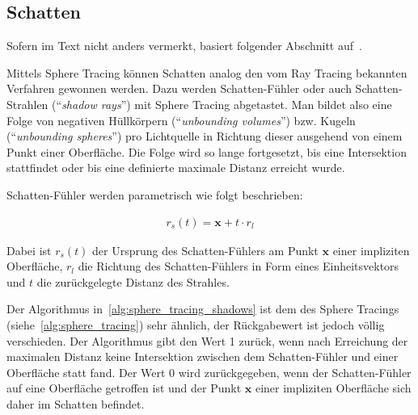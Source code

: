 
\subsection{Schatten}
\label{sec:rendering_implicit_surfaces_shadows}

Sofern im Text nicht anders vermerkt, basiert folgender Abschnitt
auf~\cite[S. 7]{reiner_smi_2011}.

Mittels Sphere Tracing können Schatten analog den vom Ray Tracing
bekannten Verfahren gewonnen werden. Dazu werden Schatten-Fühler oder
auch Schatten-Strahlen (``\textit{shadow rays}'') mit Sphere Tracing
abgetastet.  Man bildet also eine Folge von negativen Hüllkörpern
(``\textit{unbounding volumes}'') bzw. Kugeln (``\textit{unbounding
    spheres}'') pro Lichtquelle in Richtung dieser ausgehend von einem
Punkt einer Oberfläche. Die Folge wird so lange fortgesetzt, bis eine
Intersektion stattfindet oder bis eine definierte maximale Distanz
erreicht wurde.

Schatten-Fühler werden parametrisch wie folgt beschrieben:

\begin{gather}
    r_{s}(t) = \bm{x} + t \cdot r_{l}
\end{gather}

Dabei ist $r_{s}(t)$ der Ursprung des Schatten-Fühlers am Punkt $\bm{x}$
einer impliziten Oberfläche, $r_{l}$ die Richtung des Schatten-Fühlers
in Form eines Einheitsvektors und $t$ die zurückgelegte Distanz des
Strahles.

Der Algorithmus in~\autoref{alg:sphere_tracing_shadows} ist dem des
Sphere Tracings (siehe~\autoref{alg:sphere_tracing}) sehr ähnlich, der
Rückgabewert ist jedoch völlig verschieden. Der Algorithmus gibt den
Wert 1 zurück, wenn nach Erreichung der maximalen Distanz keine
Intersektion zwischen dem Schatten-Fühler und einer Oberfläche statt
fand.  Der Wert 0 wird zurückgegeben, wenn der Schatten-Fühler auf eine
Oberfläche getroffen ist und der Punkt $\bm{x}$ einer impliziten
Oberfläche sich daher im Schatten befindet.

